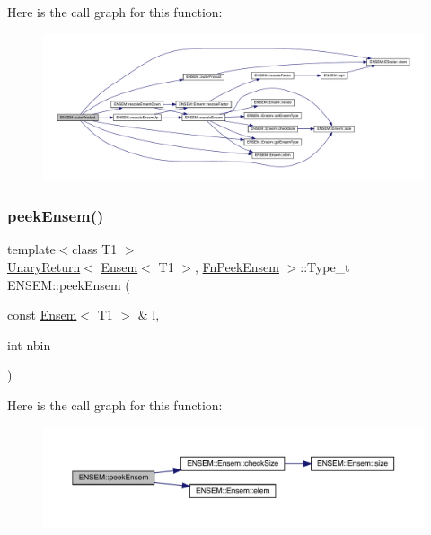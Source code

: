 Here is the call graph for this function\+:\nopagebreak
\begin{figure}[H]
\begin{center}
\leavevmode
\includegraphics[width=350pt]{d1/d9e/group__eensem_ga63f92da09e74b21cf1e10e19dbbc9437_cgraph}
\end{center}
\end{figure}
\mbox{\label{group__eensem_gafcbe1a7f74ec79a0842cfa9aa2ee948c}} 
\subsubsection{\texorpdfstring{peekEnsem()}{peekEnsem()}}
{\footnotesize\ttfamily template$<$class T1 $>$ \\
\mbox{\hyperlink{structENSEM_1_1UnaryReturn}{Unary\+Return}}$<$ \mbox{\hyperlink{classENSEM_1_1Ensem}{Ensem}}$<$ T1 $>$, \mbox{\hyperlink{structENSEM_1_1FnPeekEnsem}{Fn\+Peek\+Ensem}} $>$\+::Type\+\_\+t E\+N\+S\+E\+M\+::peek\+Ensem (\begin{DoxyParamCaption}\item[{const \mbox{\hyperlink{classENSEM_1_1Ensem}{Ensem}}$<$ T1 $>$ \&}]{l,  }\item[{int}]{nbin }\end{DoxyParamCaption})\hspace{0.3cm}{\ttfamily [inline]}}

Here is the call graph for this function\+:\nopagebreak
\begin{figure}[H]
\begin{center}
\leavevmode
\includegraphics[width=350pt]{d1/d9e/group__eensem_gafcbe1a7f74ec79a0842cfa9aa2ee948c_cgraph}
\end{center}
\end{figure}
\mbox{\label{group__eensem_gab81975329321ddb7926b2822e0c53a8e}} 
